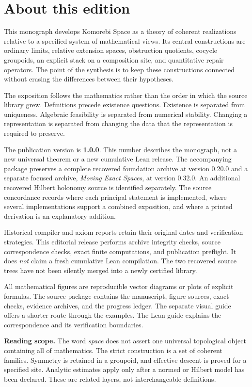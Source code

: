 \documentclass[11pt]{article}
\begin{document}
\KomorebiCover
{}
\section*{About this edition}
This monograph develops Komorebi Space as a theory of coherent realizations relative to a specified system of mathematical views. Its central constructions are ordinary limits, relative extension spaces, obstruction quotients, cocycle groupoids, an explicit stack on a composition site, and quantitative repair operators. The point of the synthesis is to keep these constructions connected without erasing the differences between their hypotheses.

The exposition follows the mathematics rather than the order in which the source library grew. Definitions precede existence questions. Existence is separated from uniqueness. Algebraic feasibility is separated from numerical stability. Changing a representation is separated from changing the data that the representation is required to preserve.

The publication version is \textbf{1.0.0}. This number describes the monograph, not a new universal theorem or a new cumulative Lean release. The accompanying package preserves a complete recovered foundation archive at version 0.20.0 and a separate focused archive, \emph{Moving Exact Spaces}, at version 0.32.0. An additional recovered Hilbert holonomy source is identified separately. The source concordance records where each principal statement is implemented, where several implementations support a combined exposition, and where a printed derivation is an explanatory addition.

Historical compiler and axiom reports retain their original dates and verification strategies. This editorial release performs archive integrity checks, source correspondence checks, exact finite computations, and publication preflight. It does \emph{not} claim a fresh cumulative Lean compilation. The two recovered source trees have not been silently merged into a newly certified library.

All mathematical figures are reproducible vector diagrams or plots of explicit formulas. The source package contains the manuscript, figure sources, exact checks, evidence archives, and the progress ledger. The separate visual guide offers a shorter route through the examples. The Lean guide explains the correspondence and its verification boundaries.

\begin{scopebox}
\textbf{Reading scope.} The word \emph{space} does not assert one universal topological object containing all of mathematics. The strict construction is a set of coherent families. Symmetry is retained in a groupoid, and effective descent is proved for a specified site. Analytic estimates apply only after a normed or Hilbert model has been declared. These are related layers, not interchangeable definitions.
\end{scopebox}
\end{document}
